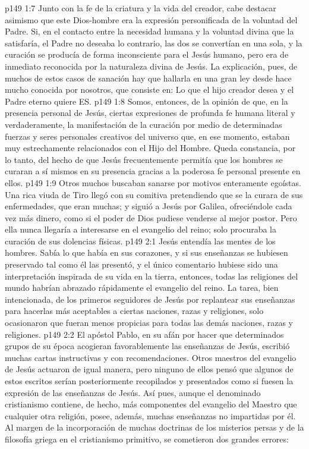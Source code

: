 \vs p149 1:7 Junto con la fe de la criatura y la vida del creador, cabe destacar asimismo que este Dios\hyp{}hombre era la expresión personificada de la voluntad del Padre. Si, en el contacto entre la necesidad humana y la voluntad divina que la satisfaría, el Padre no deseaba lo contrario, las dos se convertían en una sola, y la curación se producía de forma inconsciente para el Jesús humano, pero era de inmediato reconocida por la naturaleza divina de Jesús. La explicación, pues, de muchos de estos casos de sanación hay que hallarla en una gran ley desde hace mucho conocida por nosotros, que consiste en: Lo que el hijo creador desea y el Padre eterno quiere ES.
\vs p149 1:8 \pc Somos, entonces, de la opinión de que, en la presencia personal de Jesús, ciertas expresiones de profunda fe humana  literal y verdaderamente, la manifestación de la curación por medio de determinadas fuerzas y seres personales creativos del universo que, en ese momento, estaban muy estrechamente relacionados con el Hijo del Hombre. Queda constancia, por lo tanto, del hecho de que Jesús frecuentemente permitía que los hombres se curaran a sí mismos en su presencia gracias a la poderosa fe personal presente en ellos.
\vs p149 1:9 Otros muchos buscaban sanarse por motivos enteramente egoístas. Una rica viuda de Tiro llegó con su comitiva pretendiendo que se la curara de sus enfermedades, que eran muchas; y siguió a Jesús por Galilea, ofreciéndole cada vez más dinero, como si el poder de Dios pudiese venderse al mejor postor. Pero ella nunca llegaría a interesarse en el evangelio del reino; solo procuraba la curación de sus dolencias físicas.
\vs p149 2:1 Jesús entendía las mentes de los hombres. Sabía lo que había en sus corazones, y si sus enseñanzas se hubiesen preservado tal como él las presentó, y el único comentario hubiese sido una interpretación inspirada de su vida en la tierra, entonces, todas las religiones del mundo habrían abrazado rápidamente el evangelio del reino. La tarea, bien intencionada, de los primeros seguidores de Jesús por replantear sus enseñanzas para hacerlas más aceptables a ciertas naciones, razas y religiones, solo ocasionaron que fueran menos propicias para todas las demás naciones, razas y religiones.
\vs p149 2:2 El apóstol Pablo, en su afán por hacer que determinados grupos de su época acogieran favorablemente las enseñanzas de Jesús, escribió muchas cartas instructivas y con recomendaciones. Otros maestros del evangelio de Jesús actuaron de igual manera, pero ninguno de ellos pensó que algunos de estos escritos serían posteriormente recopilados y presentados como si fuesen la expresión de las enseñanzas de Jesús. Así pues, aunque el denominado cristianismo contiene, de hecho, más componentes del evangelio del Maestro que cualquier otra religión, posee, además, muchas enseñanzas no impartidas por él. Al margen de la incorporación de muchas doctrinas de los misterios persas y de la filosofía griega en el cristianismo primitivo, se cometieron dos grandes errores:
